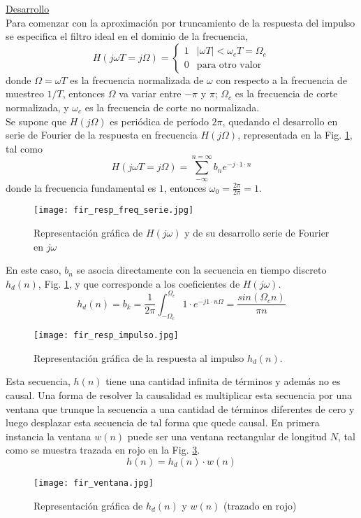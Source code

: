 \documentclass[informe.tex]{subfiles}
\begin{document}
\underline{Desarrollo}\\

Para comenzar con la aproximación por truncamiento de la respuesta del impulso se especifica el filtro ideal en el dominio de la frecuencia, 
	$$
		H(j \omega T= j\Omega) = \begin{cases}
									1  & |\omega T| < \omega_c T=\Omega_c \\
									0  & \mbox{para otro valor}						
								 \end{cases}
	$$
donde $\Omega=\omega T$	 es la frecuencia normalizada de $\omega$ con respecto a la frecuencia de muestreo $1/T$, entonces $\Omega$ va variar entre $-\pi$ y $\pi$; $\Omega_c$ es la frecuencia de corte normalizada, y  $\omega_c$ es la frecuencia de corte no normalizada.\\

Se supone que $H(j\Omega)$ es periódica de período $2\pi$, quedando el desarrollo en serie de Fourier de la respuesta en frecuencia $H(j\Omega)$, representada en la Fig. \ref{fig:fir:representacion_Hs}, tal como
	$$
		H(j\omega T= j\Omega) = \sum_{-\infty}^{n=\infty}{b_n e^{-j \cdot 1 \cdot n}}
	$$
donde la frecuencia fundamental es $1$, entonces $\omega_0 = \frac{2\pi}{2\pi}=1$.
		\begin{figure}[h!]
		\centering
		\texttt{[image: fir\_resp\_freq\_serie.jpg]}
		\caption{Representación gráfica de $H(j\omega)$ y de su desarrollo serie de Fourier en $j\omega$}
		\label{fig:fir:representacion_Hs}
		\end{figure}
En este caso, $b_n$ se asocia directamente con la secuencia en tiempo discreto $h_d(n)$, Fig. \ref{fig:fir:representacion_Hs}, y que corresponde a los coeficientes de $H(j\omega)$.\\
	$$
		h_d(n) = b_k = \frac{1}{2\pi} \int_{-\Omega_c}^{\Omega_c}
		                                  {1 \cdot e^{-j 1 \cdot n \Omega}}
		           = \frac{ sin( \Omega_c n )}{ \pi n}
	$$
		\begin{figure}[h!]
		\centering
		\texttt{[image: fir\_resp\_impulso.jpg]}
		\caption{Representación gráfica de la respuesta al impulso $h_d(n)$.}
		\label{fig:fir:representacion_hdn}
		\end{figure}
Esta secuencia, $h(n)$ tiene una cantidad infinita de términos y además no es causal. Una forma de resolver la causalidad es multiplicar esta secuencia por una ventana que trunque la secuencia a una cantidad de términos diferentes de cero y luego desplazar esta secuencia de tal forma que quede causal. En primera instancia la ventana $w(n)$ puede ser una ventana rectangular de longitud $N$, tal como se muestra trazada en rojo en la Fig. \ref{fig:fir:representacion_venta_rectangular}.
	\begin{equation}
		\label{eqn:fir:ventana}	
		h(n) = h_d(n) \cdot w(n)
	\end{equation}
    \begin{figure}[h!]
		\centering
		\texttt{[image: fir\_ventana.jpg]}
		\caption{Representación gráfica de $h_d(n)$ y $w(n)$ (trazado en rojo)}
		\label{fig:fir:representacion_venta_rectangular}
	\end{figure}
\end{document}
